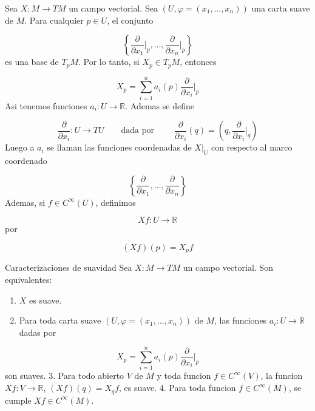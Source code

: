\begin{bookremark}{}
Sea $X:M\rightarrow TM$ un campo vectorial. Sea $(U,\varphi=(x_1,\ldots,x_n))$ una carta suave de $M$. Para cualquier $p \in U$, el conjunto

\[
\left\{\frac{\partial}{\partial x_1}\bigg|_p,\ldots,\frac{\partial}{\partial x_n}\bigg|_p\right\}
\]
es una base de $T_pM$. Por lo tanto, si $X_p \in T_pM$, entonces

\[
X_p=\sum_{i=1}^n a_i(p)\frac{\partial}{\partial x_i}|_p
\]
Asi tenemos funciones $a_i:U \to \mathbb R$. Ademas se define

\[
\frac{\partial}{\partial x_{i}}:U\rightarrow  TU\qquad \text{dada por }\qquad \frac{\partial}{\partial x_{i}}(q)=\left(q,\frac{\partial}{\partial x_{i}}\bigg|_{q}\right)
\]
Luego a $a_{i}$ se llaman las funciones coordenadas de $X|_U$ con respecto al marco coordenado

\[
\left\{\frac{\partial}{\partial x_1},\ldots,\frac{\partial}{\partial x_n}\right\}
\]
Ademas, si $f \in C^\infty(U)$, definimos

\[
Xf:U \to \mathbb R
\]
por

\[
(Xf)(p)=X_p f
\]
\end{bookremark}
\begin{bookproposition}{Caracterizaciones de suavidad}
Sea $X:M \to TM$ un campo vectorial. Son equivalentes:

\begin{enumerate}
\item $X$ es suave.
\item Para toda carta suave $(U,\varphi=(x_1,\ldots,x_n))$ de $M$, las funciones $a_i:U \to \mathbb R$ dadas por
\end{enumerate}
\[
X_p=\sum_{i=1}^n a_i(p)\frac{\partial}{\partial x_i}|_p
\]
son suaves. 3. Para todo abierto $V$ de $M$ y toda funcion $f \in C^\infty(V)$, la funcion $Xf:V \to \mathbb R$, $(Xf)(q)=X_q f$, es suave. 4. Para toda funcion $f \in C^\infty(M)$, se cumple $Xf \in C^\infty(M)$.

\end{bookproposition}
